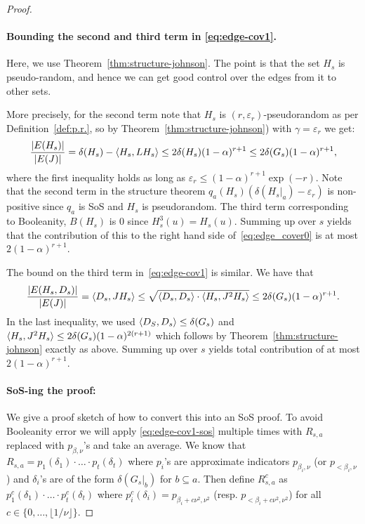 \documentclass[11pt]{article}
\DeclarePairedDelimiter\ip{\langle}{\rangle}
\def \sos {SoS\xspace}
\def \eps {{\varepsilon}}
\theoremstyle{definition}
\begin{document}
\begin{proof}
\paragraph{Bounding the second and third term in \eqref{eq:edge-cov1}.} 
Here, we use Theorem~\ref{thm:structure-johnson}. 
The point is that the set $H_s$ is pseudo-random, 
and hence we can get good control over the edges from it to other sets. 

More precisely, for the second term note that $H_s$ is  $(r,\eps_r)$-pseudorandom  as per Definition~\ref{def:p.r.}, 
so by Theorem~\ref{thm:structure-johnson}) with $\gamma =\eps_r$ we get: 
\begin{equation}\label{eq:third-term-ec}
\frac{|E(H_s)|}{|E(J)|} = \delta(H_s) - \ip{H_s, LH_s} \leq 2\delta(H_s)(1-\alpha)^{r+1} \leq 2\delta(G_s)(1-\alpha)^{r+1},
\end{equation}
where the first inequality holds as long as $\eps_r \leq (1-\alpha)^{r+1}\exp(-r)$. Note that the second term in the structure theorem $q_a(H_s)(\delta(H_s|_a) - \eps_r)$ is non-positive since $q_a$ is \sos and $H_s$ is pseudorandom. The third term corresponding to Booleanity, $B(H_s)$ is $0$ since $H_s^3(u) = H_s(u)$.
Summing up over $s$ yields that the contribution of this to the right hand side of~\eqref{eq:edge_cover0} 
is at most $2(1-\alpha)^{r+1}$.

The bound on the third term in~\eqref{eq:edge-cov1} is similar. We have that
\begin{equation}\label{eq:fourth-term-ec}
\frac{|E(H_s,D_s)|}{|E(J)|} = \ip{D_s, J H_s} \leq \sqrt{\ip{D_s,D_s} \cdot \ip{H_s, J^2 H_s}} \leq 2\delta(G_s)(1-\alpha)^{r+1}.
\end{equation}
In the last inequality, we used $\ip{D_S,D_s}\leq \delta(G_s)$ and 
$\ip{H_s, J^2 H_s}\leq 2\delta(G_s)(1-\alpha)^{2(r+1)}$ 
which follows by Theorem~\ref{thm:structure-johnson} 
exactly as above. Summing up over $s$ yields total contribution of at most $2(1-\alpha)^{r+1}$.


\paragraph{SoS-ing the proof:} We give a proof sketch of how to convert this into an SoS proof. To avoid Booleanity error we will apply \eqref{eq:edge-cov1-sos} multiple times with $R_{s,a}$ replaced with $p_{\beta,\nu}$'s and take an average. We know that $R_{s,a} = p_1(\delta_1) \cdot \ldots\cdot p_t(\delta_t)$ where $p_i$'s are approximate indicators $p_{\beta_i,\nu}$ (or $p_{<\beta_i,\nu}$) and $\delta_i$'s are of the form $\delta(G_s|_b)$ for $b \subseteq a$. Then define $R^c_{s,a}$ as $p^c_1(\delta_1) \cdot \ldots\cdot p^c_t(\delta_t)$ where $p^c_i(\delta_i) = p_{\beta_i+c\nu^2,\nu^2}$ (resp. $p_{<\beta_i+c\nu^2,\nu^2}$) for all $c \in \{0,\ldots,\lfloor 1/\nu \rfloor\}$.


\end{proof}
\end{document}
